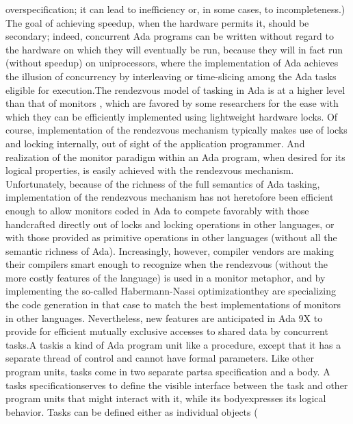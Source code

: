 \txtxemph[]overspecification\txtxendemph[]; it can lead to inefficiency
or, in some cases, to incompleteness.) The goal of achieving speedup,
when the hardware permits it, should be secondary; indeed, concurrent
Ada programs can be written without regard to the hardware on which
they will eventually be run, because they will in fact run (without
speedup) on uniprocessors, where the implementation of Ada achieves
the illusion of concurrency by interleaving or time-slicing among
the Ada tasks eligible for execution.\Endpara[]
\Para[]The rendezvous model of tasking in Ada is at a higher level
than that of monitors \Endcit[], which
are favored by some researchers for the ease with which they can be
efficiently implemented using lightweight hardware locks. Of course,
implementation of the rendezvous mechanism typically makes use of
locks and locking internally, out of sight of the application programmer.
And realization of the monitor paradigm within an Ada program, when
desired for its logical properties, is easily achieved with the rendezvous
mechanism. Unfortunately, because of the richness of the full semantics
of Ada tasking, implementation of the rendezvous mechanism has not
heretofore been efficient enough to allow monitors coded in Ada to
compete favorably with those handcrafted directly out of locks and
locking operations in other languages, or with those provided as primitive
operations in other languages (without all the semantic richness of
Ada). Increasingly, however, compiler vendors are making their compilers
smart enough to recognize when the rendezvous (without the more costly
features of the language) is used in a monitor metaphor, and by implementing
the so-called \ldquo[]Habermann-Nassi optimization\rdquo[] %
\Endcit[] they are specializing the
code generation in that case to match the best implementations of
monitors in other languages. Nevertheless, new features are anticipated
in Ada 9X to provide for efficient mutually exclusive accesses to
shared data by concurrent tasks.\Endpara[]
\Para[]A \txtxemph[]task\txtxendemph[] is a kind of Ada program unit
like a procedure, except that it has a separate thread of control
and cannot have formal parameters. Like other program units, tasks
come in two separate parts\EmDash[]a specification and a body. A task\rsquo[]s
\txtxemph[]specification\txtxendemph[] serves to define the visible
interface between the task and other program units that might interact
with it, while its \txtxemph[]body\txtxendemph[] expresses its logical
behavior. Tasks can be defined either as individual objects (%
